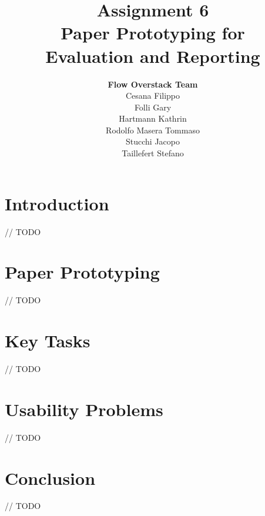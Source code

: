 \documentclass[12pt]{scrartcl}
\title{Assignment 6\\ Paper Prototyping for\\ Evaluation and Reporting}
\author{\textbf{Flow Overstack Team}\\ Cesana Filippo\\ Folli Gary\\ Hartmann Kathrin\\ Rodolfo Masera Tommaso\\ Stucchi Jacopo\\ Taillefert Stefano}
\date{}
\begin{document}
\maketitle

\tableofcontents

\newpage

\section{Introduction}

	
	// TODO
	
	
\section{Paper Prototyping}

	
	// TODO
	
	
\section{Key Tasks}

	
	// TODO 
	

\section{Usability Problems}

	
	// TODO
	
	
\section{Conclusion}

	
	// TODO

	
	
\end{document}
